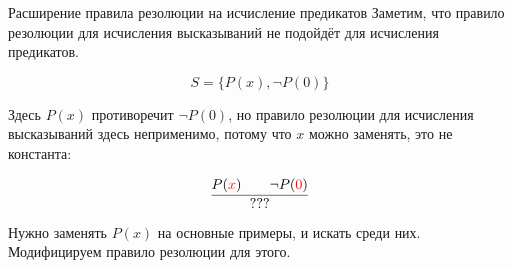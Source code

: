\documentclass[aspectratio=169]{beamer}
\begin{document}
\begin{frame}{Расширение правила резолюции на исчисление предикатов}
Заметим, что правило резолюции для исчисления высказываний не подойдёт для исчисления предикатов.

$$S = \{ P(x), \neg P(0)\}$$

Здесь $P(x)$ противоречит $\neg P(0)$, но правило резолюции для исчисления высказываний здесь неприменимо, потому
что $x$ можно заменять, это не константа:

$$\infer{???}{P({\color{red}x})\quad\quad\neg P({\color{red}0})}$$

Нужно заменять $P(x)$ на основные примеры, и искать среди них. Модифицируем правило резолюции для этого.

\end{frame}
\end{document}
